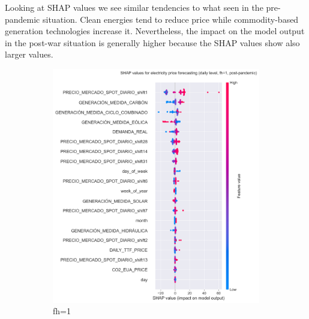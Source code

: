 Looking at SHAP values we see similar tendencies to what seen in the pre-pandemic situation. Clean energies tend to reduce price while commodity-based generation technologies increase it. Nevertheless, the impact on the model output in the post-war situation is generally higher because the SHAP values show also larger values.

\begin{figure}[H]
\centering
    \begin{subfigure}{.45\textwidth}
        \centering
        \includegraphics[width=1\linewidth]{images/analysis/shap-daily-post-1}
        \caption{fh=1}
    \end{subfigure}
    \begin{subfigure}{.45\textwidth}
        \centering

\end{subfigure}
\end{figure}
